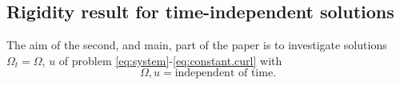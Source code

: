 \documentclass[10pt,reqno,a4paper]{article}
\numberwithin{equation}{section}
\theoremstyle{plain}
\theoremstyle{definition}
\newcommand{\Om}{\Omega}
\newcommand{\la}{\langle}
\newcommand{\ra}{\rangle}
\newcommand{\pa}{\partial}
\renewcommand{\div}{\operatorname{div}} %
\newcommand{\curl}{\operatorname{curl}}
\begin{document}
\subsection{{Rigidity result for time-independent solutions}}



The aim of the second, and main, part of the paper 
is to investigate solutions $\Om_t = \Om$, $u$ of problem \eqref{eq:system}-\eqref{eq:constant.curl} 
with 
\begin{equation} \label{time.indep.sol}
\Om, u = \text{independent of time}.
\end{equation}


\end{document}
